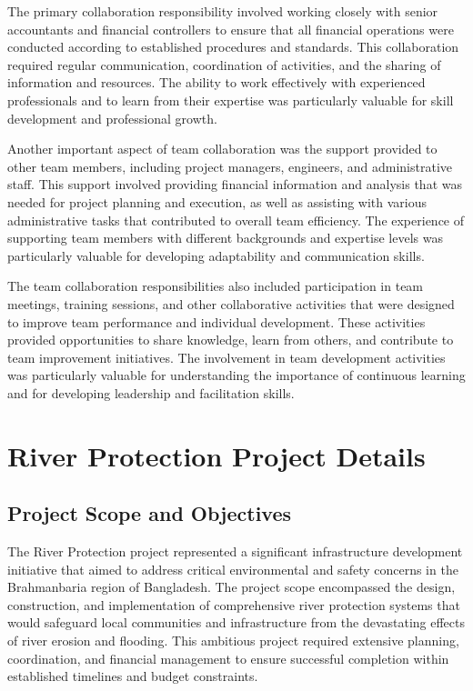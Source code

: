 The primary collaboration responsibility involved working closely with senior accountants and financial controllers to ensure that all financial operations were conducted according to established procedures and standards. This collaboration required regular communication, coordination of activities, and the sharing of information and resources. The ability to work effectively with experienced professionals and to learn from their expertise was particularly valuable for skill development and professional growth.

Another important aspect of team collaboration was the support provided to other team members, including project managers, engineers, and administrative staff. This support involved providing financial information and analysis that was needed for project planning and execution, as well as assisting with various administrative tasks that contributed to overall team efficiency. The experience of supporting team members with different backgrounds and expertise levels was particularly valuable for developing adaptability and communication skills.

The team collaboration responsibilities also included participation in team meetings, training sessions, and other collaborative activities that were designed to improve team performance and individual development. These activities provided opportunities to share knowledge, learn from others, and contribute to team improvement initiatives. The involvement in team development activities was particularly valuable for understanding the importance of continuous learning and for developing leadership and facilitation skills.

\section{River Protection Project Details}

\subsection{Project Scope and Objectives}
The River Protection project represented a significant infrastructure development initiative that aimed to address critical environmental and safety concerns in the Brahmanbaria region of Bangladesh. The project scope encompassed the design, construction, and implementation of comprehensive river protection systems that would safeguard local communities and infrastructure from the devastating effects of river erosion and flooding. This ambitious project required extensive planning, coordination, and financial management to ensure successful completion within established timelines and budget constraints.

